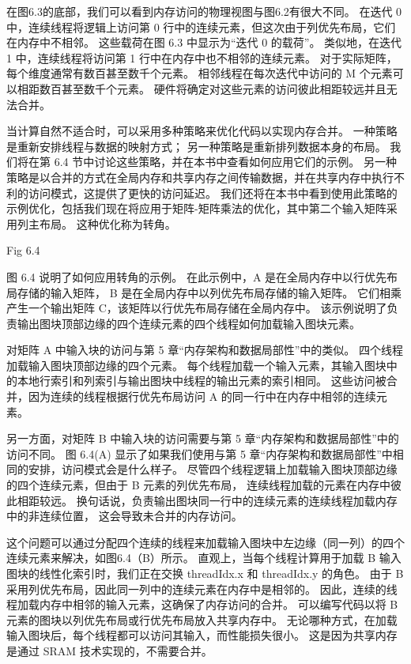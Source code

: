 在图6.3的底部，我们可以看到内存访问的物理视图与图6.2有很大不同。 
在迭代 0 中，连续线程将逻辑上访问第 0 行中的连续元素，但这次由于列优先布局，它们在内存中不相邻。 
这些载荷在图 6.3 中显示为“迭代 0 的载荷”。 类似地，在迭代 1 中，连续线程将访问第 1 行中在内存中也不相邻的连续元素。 
对于实际矩阵，每个维度通常有数百甚至数千个元素。 相邻线程在每次迭代中访问的 M 个元素可以相距数百甚至数千个元素。 
硬件将确定对这些元素的访问彼此相距较远并且无法合并。

当计算自然不适合时，可以采用多种策略来优化代码以实现内存合并。 
一种策略是重新安排线程与数据的映射方式； 另一种策略是重新排列数据本身的布局。 
我们将在第 6.4 节中讨论这些策略，并在本书中查看如何应用它们的示例。 
另一种策略是以合并的方式在全局内存和共享内存之间传输数据，并在共享内存中执行不利的访问模式，这提供了更快的访问延迟。 
我们还将在本书中看到使用此策略的示例优化，包括我们现在将应用于矩阵-矩阵乘法的优化，其中第二个输入矩阵采用列主布局。 
这种优化称为转角。

{\color{red} Fig 6.4}

图 6.4 说明了如何应用转角的示例。 在此示例中，A 是在全局内存中以行优先布局存储的输入矩阵，
B 是在全局内存中以列优先布局存储的输入矩阵。 它们相乘产生一个输出矩阵 C，该矩阵以行优先布局存储在全局内存中。 
该示例说明了负责输出图块顶部边缘的四个连续元素的四个线程如何加载输入图块元素。

对矩阵 A 中输入块的访问与第 5 章“内存架构和数据局部性”中的类似。 四个线程加载输入图块顶部边缘的四个元素。 
每个线程加载一个输入元素，其输入图块中的本地行索引和列索引与输出图块中线程的输出元素的索引相同。 
这些访问被合并，因为连续的线程根据行优先布局访问 A 的同一行中在内存中相邻的连续元素。

另一方面，对矩阵 B 中输入块的访问需要与第 5 章“内存架构和数据局部性”中的访问不同。 
图 6.4(A) 显示了如果我们使用与第 5 章“内存架构和数据局部性”中相同的安排，访问模式会是什么样子。 
尽管四个线程逻辑上加载输入图块顶部边缘的四个连续元素，但由于 B 元素的列优先布局，
连续线程加载的元素在内存中彼此相距较远。 换句话说，负责输出图块同一行中的连续元素的连续线程加载内存中的非连续位置，
这会导致未合并的内存访问。

这个问题可以通过分配四个连续的线程来加载输入图块中左边缘（同一列）的四个连续元素来解决，如图6.4（B）所示。 
直观上，当每个线程计算用于加载 B 输入图块的线性化索引时，我们正在交换 threadIdx.x 和 threadIdx.y 的角色。 
由于 B 采用列优先布局，因此同一列中的连续元素在内存中是相邻的。 
因此，连续的线程加载内存中相邻的输入元素，这确保了内存访问的合并。 
可以编写代码以将 B 元素的图块以列优先布局或行优先布局放入共享内存中。 
无论哪种方式，在加载输入图块后，每个线程都可以访问其输入，而性能损失很小。 
这是因为共享内存是通过 SRAM 技术实现的，不需要合并。

